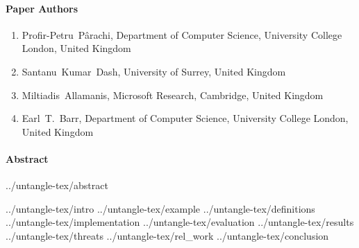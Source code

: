 
\paragraph{Paper Authors}
\begin{enumerate}
    \item[] Profir-Petru~P\^arachi, Department of Computer Science, University College London, United Kingdom
    \item[] Santanu~Kumar~Dash, University of Surrey, United Kingdom
    \item[] Miltiadis~Allamanis, Microsoft Research, Cambridge, United Kingdom
    \item[] Earl~T.~Barr, Department of Computer Science, University College London, United Kingdom
\end{enumerate}

\paragraph{Abstract}
{../untangle-tex/abstract}

{../untangle-tex/intro}
{../untangle-tex/example}
{../untangle-tex/definitions}
{../untangle-tex/implementation}
{../untangle-tex/evaluation}
{../untangle-tex/results}
{../untangle-tex/threats}
{../untangle-tex/rel_work}
{../untangle-tex/conclusion}